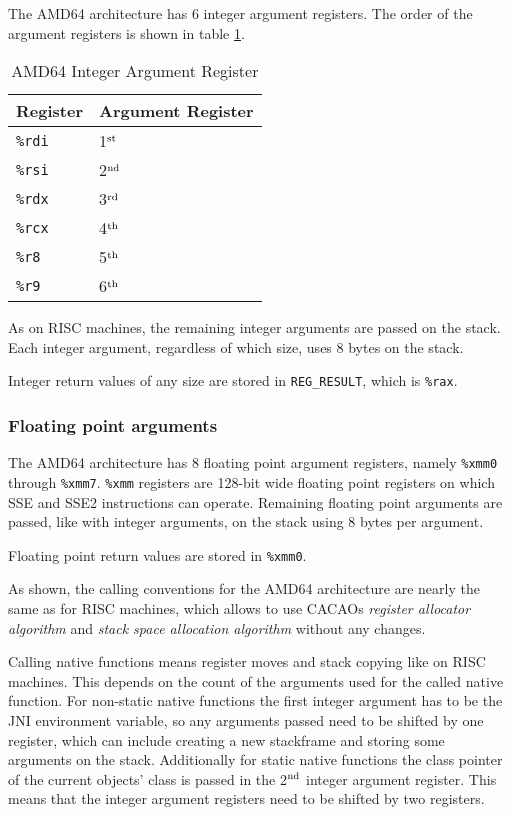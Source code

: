 The AMD64 architecture has 6 integer argument registers. The order of
the argument registers is shown in table
\ref{amd64integerargumentregisters}.

\begin{table}
\begin{center}
\begin{tabular}[b]{|l|l|}
\hline
Register       & Argument Register \\ \hline
\texttt{\%rdi} & 1$^{\rm st}$      \\ \hline
\texttt{\%rsi} & 2$^{\rm nd}$      \\ \hline
\texttt{\%rdx} & 3$^{\rm rd}$      \\ \hline
\texttt{\%rcx} & 4$^{\rm th}$      \\ \hline
\texttt{\%r8}  & 5$^{\rm th}$      \\ \hline
\texttt{\%r9}  & 6$^{\rm th}$      \\ \hline
\end{tabular}
\caption{AMD64 Integer Argument Register}
\label{amd64integerargumentregisters}
\end{center}
\end{table}

As on RISC machines, the remaining integer arguments are passed on the
stack. Each integer argument, regardless of which size, uses 8 bytes
on the stack.

Integer return values of any size are stored in \texttt{REG\_RESULT},
which is \texttt{\%rax}.

\subsubsection{Floating point arguments}

The AMD64 architecture has 8 floating point argument registers, namely
\texttt{\%xmm0} through \texttt{\%xmm7}. \texttt{\%xmm} registers are
128-bit wide floating point registers on which SSE and SSE2
instructions can operate. Remaining floating point arguments are
passed, like with integer arguments, on the stack using 8 bytes per
argument.

Floating point return values are stored in \texttt{\%xmm0}.

As shown, the calling conventions for the AMD64 architecture are
nearly the same as for RISC machines, which allows to use CACAOs
\textit{register allocator algorithm} and \textit{stack space
allocation algorithm} without any changes.

Calling native functions means register moves and stack copying like
on RISC machines. This depends on the count of the arguments used for
the called native function. For non-static native functions the first
integer argument has to be the JNI environment variable, so any
arguments passed need to be shifted by one register, which can include
creating a new stackframe and storing some arguments on the
stack. Additionally for static native functions the class pointer of
the current objects' class is passed in the 2$^{\rm nd}$ integer
argument register. This means that the integer argument registers need
to be shifted by two registers.

